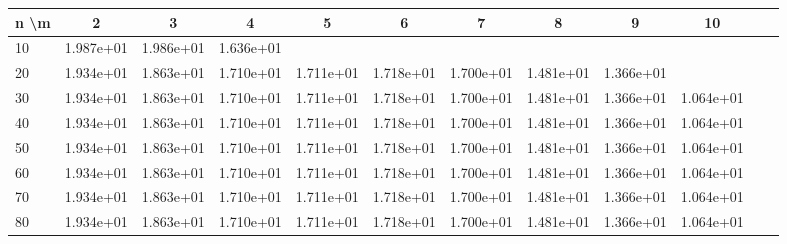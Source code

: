 \begin{table}[h]
\centering
\scriptsize
\setlength{\tabcolsep}{2pt}
\begin{tabular}{|l|ccccccccccc||}
\hline
n \textbackslash m & 2 & 3 & 4 & 5 & 6 & 7 & 8 & 9 & 10 \\\hline
10 & \cellcolor{Red!73}1.987e+01 & \cellcolor{Red!73}1.986e+01 & \cellcolor{Red!57}1.636e+01 \\
20 & \cellcolor{Red!70}1.934e+01 & \cellcolor{Red!67}1.863e+01 & \cellcolor{Red!60}1.710e+01 & \cellcolor{Red!60}1.711e+01 & \cellcolor{Red!61}1.718e+01 & \cellcolor{Red!60}1.700e+01 & \cellcolor{Red!50}1.481e+01 & \cellcolor{Red!45}1.366e+01 \\
30 & \cellcolor{Red!70}1.934e+01 & \cellcolor{Red!67}1.863e+01 & \cellcolor{Red!60}1.710e+01 & \cellcolor{Red!60}1.711e+01 & \cellcolor{Red!61}1.718e+01 & \cellcolor{Red!60}1.700e+01 & \cellcolor{Red!50}1.481e+01 & \cellcolor{Red!45}1.366e+01 & \cellcolor{Red!31}1.064e+01 \\
40 & \cellcolor{Red!70}1.934e+01 & \cellcolor{Red!67}1.863e+01 & \cellcolor{Red!60}1.710e+01 & \cellcolor{Red!60}1.711e+01 & \cellcolor{Red!61}1.718e+01 & \cellcolor{Red!60}1.700e+01 & \cellcolor{Red!50}1.481e+01 & \cellcolor{Red!45}1.366e+01 & \cellcolor{Red!31}1.064e+01 \\
50 & \cellcolor{Red!70}1.934e+01 & \cellcolor{Red!67}1.863e+01 & \cellcolor{Red!60}1.710e+01 & \cellcolor{Red!60}1.711e+01 & \cellcolor{Red!61}1.718e+01 & \cellcolor{Red!60}1.700e+01 & \cellcolor{Red!50}1.481e+01 & \cellcolor{Red!45}1.366e+01 & \cellcolor{Red!31}1.064e+01 \\
60 & \cellcolor{Red!70}1.934e+01 & \cellcolor{Red!67}1.863e+01 & \cellcolor{Red!60}1.710e+01 & \cellcolor{Red!60}1.711e+01 & \cellcolor{Red!61}1.718e+01 & \cellcolor{Red!60}1.700e+01 & \cellcolor{Red!50}1.481e+01 & \cellcolor{Red!45}1.366e+01 & \cellcolor{Red!31}1.064e+01 \\
70 & \cellcolor{Red!70}1.934e+01 & \cellcolor{Red!67}1.863e+01 & \cellcolor{Red!60}1.710e+01 & \cellcolor{Red!60}1.711e+01 & \cellcolor{Red!61}1.718e+01 & \cellcolor{Red!60}1.700e+01 & \cellcolor{Red!50}1.481e+01 & \cellcolor{Red!45}1.366e+01 & \cellcolor{Red!31}1.064e+01 \\
80 & \cellcolor{Red!70}1.934e+01 & \cellcolor{Red!67}1.863e+01 & \cellcolor{Red!60}1.710e+01 & \cellcolor{Red!60}1.711e+01 & \cellcolor{Red!61}1.718e+01 & \cellcolor{Red!60}1.700e+01 & \cellcolor{Red!50}1.481e+01 & \cellcolor{Red!45}1.366e+01 & \cellcolor{Red!31}1.064e+01 \\

\end{tabular}
\end{table}
